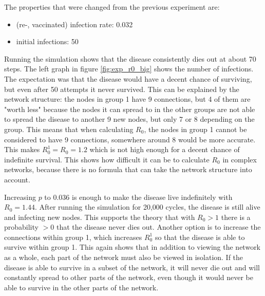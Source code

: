 The properties that were changed from the previous experiment are:
\begin{itemize}
    \item (re-, vaccinated) infection rate: 0.032
    \item initial infections: 50
\end{itemize}

Running the simulation shows that the disease consistently dies out at about 70 steps. The left graph in figure \ref{fig:exp_r0_big} shows the number of infections. The expectation was that the disease would have a decent chance of surviving, but even after 50 attempts it never survived. This can be explained by the network structure: the nodes in group 1 have 9 connections, but 4 of them are "worth less" because the nodes it can spread to in the other groups are not able to spread the disease to another 9 new nodes, but only 7 or 8 depending on the group. This means that when calculating $R_0$, the nodes in group 1 cannot be considered to have 9 connections, somewhere around 8 would be more accurate. This makes $R_0^1 = R_0 = 1.2$ which is not high enough for a decent chance of indefinite survival. This shows how difficult it can be to calculate $R_0$ in complex networks, because there is no formula that can take the network structure into account.

Increasing $p$ to 0.036 is enough to make the disease live indefinitely with $R_0 = 1.44$. After running the simulation for 20,000 cycles, the disease is still alive and infecting new nodes. This supports the theory that with $R_0 > 1$ there is a probability $> 0$ that the disease never dies out. Another option is to increase the connections within group 1, which increases $R_0^1$ so that the disease is able to survive within group 1. This again shows that in addition to viewing the network as a whole, each part of the network must also be viewed in isolation. If the disease is able to survive in a subset of the network, it will never die out and will constantly spread to other parts of the network, even though it would never be able to survive in the other parts of the network.


